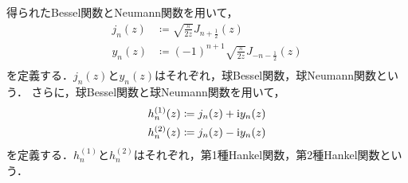 \documentclass{report}
\begin{document}
    得られたBessel関数とNeumann関数を用いて，
    \begin{align}
      j_n(z) &\coloneqq \sqrt{\frac{\pi}{2z}}J_{n + \frac{1}{2}}(z) \\ 
      y_n(z) &\coloneqq (-1)^{n + 1}\sqrt{\frac{\pi}{2z}}J_{-n-\frac{1}{2}}(z) \\ 
    \end{align}
    を定義する．$j_n(z)$と$y_n(z)$はそれぞれ，球Bessel関数，球Neumann関数という．
    さらに，球Bessel関数と球Neumann関数を用いて，
    \begin{align}
      h_n^{(1)}(z) &\coloneqq j_n(z) + \mathrm{i} y_n(z) \\ 
      h_n^{(2)}(z) &\coloneqq j_n(z) - \mathrm{i} y_n(z)
    \end{align}
    を定義する．$h_n^{(1)}$と$h_n^{(2)}$はそれぞれ，第1種Hankel関数，第2種Hankel関数という．
\end{document}
